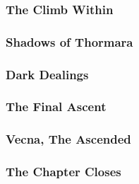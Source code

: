         \subsubsection{The Climb Within}
        \subsubsection{Shadows of Thormara}
        \subsubsection{Dark Dealings}
        \subsubsection{The Final Ascent}
        \subsubsection{Vecna, The Ascended}
        \subsubsection{The Chapter Closes}
